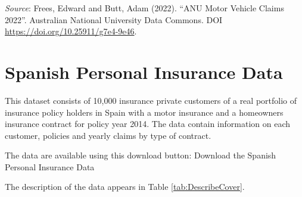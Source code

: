 \documentclass[
  12pt,
  krantz2]{Format/krantzNoCorner}
\begin{document}
\emph{Source}: Frees, Edward and Butt, Adam (2022). ``ANU Motor Vehicle Claims 2022''. Australian National University Data Commons. DOI \url{https://doi.org/10.25911/g7e4-9e46}.

\hypertarget{spanish-personal-insurance-data}{%
\section{Spanish Personal Insurance Data}\label{spanish-personal-insurance-data}}

This dataset consists of 10,000 insurance private customers of a real portfolio of insurance policy holders in Spain with a motor insurance and a homeowners insurance contract for policy year 2014. The data contain information on each customer, policies and yearly claims by type of contract.

The data are available using this download button:
Download the Spanish Personal Insurance Data

The description of the data appears in Table \ref{tab:DescribeCover}.
\end{document}

